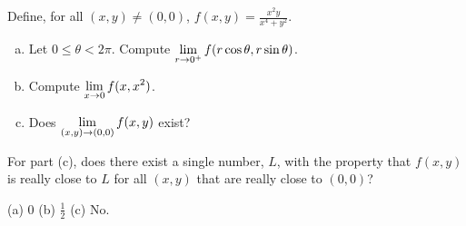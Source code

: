 \begin{question}
Define, for all $(x,y)\ne(0,0)$, $f(x,y)=\frac{x^2y}{x^4+y^2}$.
\begin{enumerate}[(a)]
\item
Let $0\le \theta<2\pi$. Compute
$\displaystyle\lim_{r\rightarrow 0^+}f(r\cos\theta,r\sin\theta)$.

\item 
Compute $\displaystyle\lim_{x\rightarrow 0}f(x,x^2)$.

\item
Does $\displaystyle\lim_{(x,y)\rightarrow (0,0)}f(x,y)$ exist?
\end{enumerate}
\end{question}

\begin{hint}
For part (c), does there exist a single number, $L$, with the property that
$f(x,y)$ is really close to $L$ for all $(x,y)$ that are really close to 
$(0,0)$?
\end{hint}

\begin{answer}
(a) $0$\qquad
(b) $\frac{1}{2}$ \qquad
(c) No.
\end{answer}

